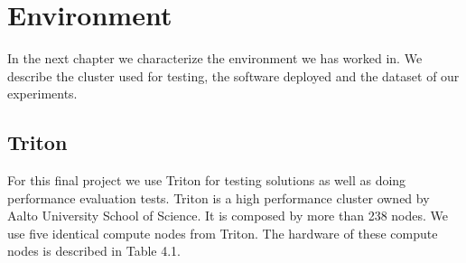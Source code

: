 \chapter{Environment}
\label{chapter:environment}

In the next chapter we characterize the environment we has worked in. We describe the cluster used for testing, the software deployed and the dataset of our experiments.

\section{Triton}

For this final project we use Triton for testing solutions as well as doing performance evaluation tests. Triton is a high performance cluster owned by Aalto University School of Science. It is composed by more than 238 nodes. We use five identical compute nodes from Triton. The hardware of these compute nodes is described in Table 4.1.  






